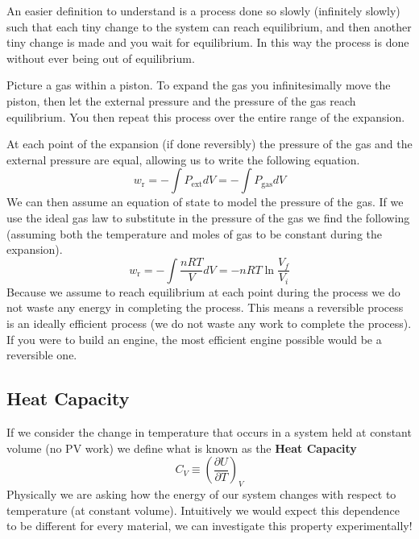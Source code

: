 \documentclass{article}
\newcommand{\be}{\begin{equation}}
\newcommand{\ee}{\end{equation}}
\begin{document}
An easier definition to understand is a process done so slowly (infinitely slowly) such that each tiny change to the system can reach equilibrium, and then another tiny change is made and you wait for equilibrium. 
In this way the process is done without ever being out of equilibrium. 

Picture a gas within a piston.
To expand the gas you infinitesimally move the piston, then let the external pressure and the pressure of the gas reach equilibrium. 
You then repeat this process over the entire range of the expansion. 

At each point of the expansion (if done reversibly) the pressure of the gas and the external pressure are equal, allowing us to write the following equation. 
\be
w_{\text{r}} = -\int P_{\text{ext}} dV = -\int P_{\text{gas}} dV 
\ee
We can then assume an equation of state to model the pressure of the gas. 
If we use the ideal gas law to substitute in the pressure of the gas we find the following (assuming both the temperature and moles of gas to be constant during the expansion). 
\be
w_{\text{r}} = - \int \frac{nRT}{V} dV = -nRT \ln \frac{V_f}{V_i}
\ee
Because we assume to reach equilibrium at each point during the process we do not waste any energy in completing the process.
This means a reversible process is an ideally efficient process (we do not waste any work to complete the process). 
If you were to build an engine, the most efficient engine possible would be a reversible one. 

\subsection*{Heat Capacity}
If we consider the change in temperature that occurs in a system held at constant volume (no PV work) we define what is known as the \textbf{Heat Capacity}
\be
C_V \equiv \left(\frac{\partial U}{\partial T}\right)_V
\ee
Physically we are asking how the energy of our system changes with respect to temperature (at constant volume). 
Intuitively we would expect this dependence to be different for every material, we can investigate this property experimentally!
\end{document}
